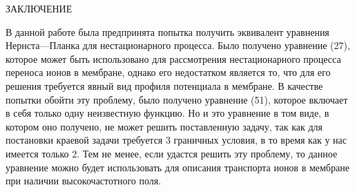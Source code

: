 \begin{center}
    ЗАКЛЮЧЕНИЕ
\end{center}
В данной работе была предпринята попытка получить эквивалент уравнения
Нернста—Планка для нестационарного процесса. Было получено уравнение
(27), которое может быть использовано для рассмотрения нестационарного
процесса переноса ионов в мембране, однако его недостатком является то,
что для его решения требуется явный вид профиля потенциала в мембране.
В качестве попытки обойти эту проблему, было получено уравнение (51),
которое включает в себя только одну неизвестную функцию. Но и это
уравнение в том виде, в котором оно получено, не может решить
поставленную задачу, так как для постановки краевой задачи требуется 3
граничных условия, в то время как у нас имеется только 2. Тем не менее,
если удастся решить эту проблему, то данное уравнение можно будет
использовать для описания транспорта ионов в мембране при наличии
высокочастотного поля.
